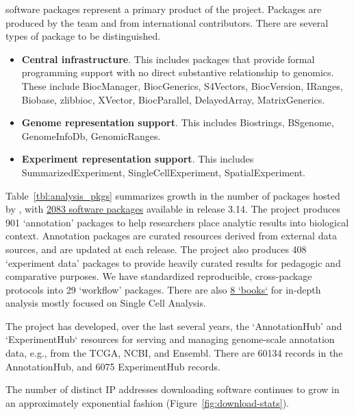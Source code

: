 \documentclass[letterpaper]{article}
\begin{document}
\R{} software packages represent a primary product of the
\Bioconductor{} project. Packages are produced by the \Bioconductor{}
team and from international
contributors.  There are several types of package to be distinguished.

\begin{itemize}
\item \textbf{Central infrastructure}.  This includes packages that
provide formal programming support with no direct substantive
relationship to genomics.  These include BiocManager,
BiocGenerics,
S4Vectors,
BiocVersion,
IRanges,
Biobase,
zlibbioc,
XVector,
BiocParallel,
DelayedArray,
MatrixGenerics. 
\item \textbf{Genome representation support}.  This includes
Biostrings, BSgenome, GenomeInfoDb, GenomicRanges.
\item \textbf{Experiment representation support}.  This includes
SummarizedExperiment, SingleCellExperiment, SpatialExperiment.
\end{itemize}

Table~\ref{tbl:analysis_pkgs} summarizes growth in the
number of packages hosted by \Bioconductor{}, with
\href{https://bioconductor.org/packages/3.14}{2083 software packages}
available in release 3.14.  The project produces 901 `annotation'
packages to help researchers place analytic results into biological
context. Annotation packages are curated resources derived from
external data sources, and are updated at each release. The project
also produces 408 `experiment data' packages to provide heavily
curated results for pedagogic and comparative purposes. We have
standardized reproducible, cross-package protocols into 29 `workflow'
packages. There are also
\href{http://bioconductor.org/checkResults/3.14/books-LATEST/}{8 `books`} for
in-depth analysis mostly focused on Single Cell Analysis.


The project has developed, over the last several years, the
`AnnotationHub' and `ExperimentHub` resources for serving and managing
genome-scale annotation data, e.g., from the TCGA, NCBI, and
Ensembl. There are 60134 records in the AnnotationHub, and 6075
ExperimentHub records.

The number of distinct IP addresses downloading software continues to
grow in an approximately exponential fashion
(Figure~\ref{fig:download-stats}).
\end{document}
